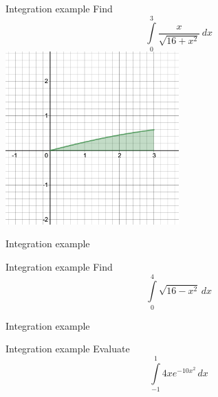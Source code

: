 \documentclass[presentation]{beamer}
\begin{document}
\begin{frame}[label={sec:orgd425b01}]{Integration example}
Find
\[
\int\limits_0^3 \frac{x}{\sqrt{16+x^2}}\,dx \]
\includegraphics[width=0.5\textwidth]{../img/day001-ex2.png}
\end{frame}

\begin{frame}[label={sec:orgf2262e6}]{Integration example}
\end{frame}

\begin{frame}[label={sec:org20b1fee}]{Integration example}
Find 
\[\int\limits_0^4 \sqrt{16-x^2}\,dx \]
\vspace{10in}
\end{frame}

\begin{frame}[label={sec:orgb9b7456}]{Integration example}
\end{frame}

\begin{frame}[label={sec:org4c54ceb}]{Integration example}
Evaluate
\[
\int\limits_{-1}^1 4xe^{-10x^2}\,dx \]
\vspace{10in}
\end{frame}
\end{document}
